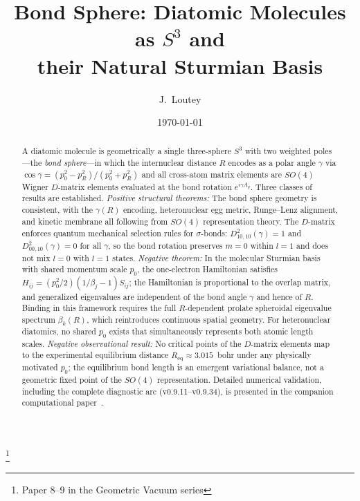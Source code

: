 \documentclass[aps,pra,twocolumn,superscriptaddress,longbibliography]{revtex4-2}
\begin{document}
\title{Bond Sphere: Diatomic Molecules as $S^3$ and\\
their Natural Sturmian Basis}
\thanks{Paper 8--9 in the Geometric Vacuum series}

\author{J.~Loutey}

\date{\today}

\begin{abstract}
A diatomic molecule is geometrically a single three-sphere $S^3$ with two
weighted poles---the \emph{bond sphere}---in which the internuclear distance
$R$ encodes as a polar angle $\gamma$ via
$\cos\gamma = (p_0^2 - p_R^2)/(p_0^2 + p_R^2)$ and all cross-atom matrix
elements are $SO(4)$ Wigner $D$-matrix elements evaluated at the bond
rotation $e^{i\gamma A_y}$.
Three classes of results are established.
\emph{Positive structural theorems:}
The bond sphere geometry is consistent, with the $\gamma(R)$ encoding,
heteronuclear egg metric, Runge--Lenz alignment, and kinetic membrane all
following from $SO(4)$ representation theory.
The $D$-matrix enforces quantum mechanical selection rules for $\sigma$-bonds:
$D^2_{10,10}(\gamma) = 1$ and $D^2_{00,10}(\gamma) = 0$ for all $\gamma$,
so the bond rotation preserves $m = 0$ within $l = 1$ and does not mix
$l = 0$ with $l = 1$ states.
\emph{Negative theorem:}
In the molecular Sturmian basis with shared momentum scale $p_0$,
the one-electron Hamiltonian satisfies $H_{ij} = (p_0^2/2)(1/\beta_j - 1)
S_{ij}$; the Hamiltonian is proportional to the overlap matrix, and
generalized eigenvalues are independent of the bond angle $\gamma$ and hence
of $R$.  Binding in this framework requires the full $R$-dependent
prolate spheroidal eigenvalue spectrum $\beta_k(R)$, which reintroduces
continuous spatial geometry.  For heteronuclear diatomics, no shared $p_0$
exists that simultaneously represents both atomic length scales.
\emph{Negative observational result:}
No critical points of the $D$-matrix elements map to the experimental
equilibrium distance $R_{\text{eq}} \approx 3.015$~bohr under any
physically motivated $p_0$; the equilibrium bond length is an emergent
variational balance, not a geometric fixed point of the $SO(4)$
representation.
Detailed numerical validation, including the complete diagnostic arc
(v0.9.11--v0.9.34), is presented in the companion computational
paper~\cite{loutey_fci}.
\end{abstract}

\maketitle
\end{document}
